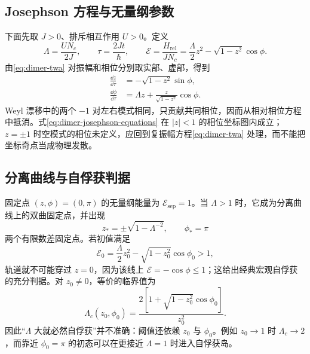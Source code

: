 \subsection{Josephson 方程与无量纲参数}

下面先取 $J>0$、排斥相互作用 $U>0$。定义
\begin{equation}
  \Lambda=\frac{UN_c}{2J},
  \qquad \tau=\frac{2Jt}{\hbar},
  \qquad
  \mathcal E=\frac{H_{\mathrm{rel}}}{JN_c}
  =\frac{\Lambda}{2}z^2-\sqrt{1-z^2}\cos\phi.
  \label{eq:dimer-dimensionless-energy}
\end{equation}
由\cref{eq:dimer-twa} 对振幅和相位分别取实部、虚部，得到
\begin{align}
  \frac{\dd z}{\dd\tau}
  &=-\sqrt{1-z^2}\sin\phi,\\
  \frac{\dd\phi}{\dd\tau}
  &=\Lambda z+\frac{z}{\sqrt{1-z^2}}\cos\phi.
  \label{eq:dimer-josephson-equations}
\end{align}
Weyl 漂移中的两个 $-1$ 对左右模式相同，只贡献共同相位，因而从相对相位方程中抵消。式\eqref{eq:dimer-josephson-equations} 在 $|z|<1$ 的相位坐标图内成立；$z=\pm1$ 时空模式的相位未定义，应回到复振幅方程\eqref{eq:dimer-twa} 处理，而不能把坐标奇点当成物理发散。

\subsection{分离曲线与自俘获判据}

固定点 $(z,\phi)=(0,\pi)$ 的无量纲能量为 $\mathcal E_{\mathrm{sep}}=1$。当 $\Lambda>1$ 时，它成为分离曲线上的双曲固定点，并出现
\begin{equation}
  z_*=\pm\sqrt{1-\Lambda^{-2}},
  \qquad \phi_*=\pi
  \label{eq:dimer-self-trapped-fixed-points}
\end{equation}
两个有限数差固定点。若初值满足
\begin{equation}
  \mathcal E_0=\frac{\Lambda}{2}z_0^2
  -\sqrt{1-z_0^2}\cos\phi_0>1,
  \label{eq:dimer-self-trapping-energy}
\end{equation}
轨道就不可能穿过 $z=0$，因为该线上 $\mathcal E=-\cos\phi\le1$；这给出经典宏观自俘获的充分判据。对 $z_0\ne0$，等价的临界值为
\begin{equation}
  \Lambda_c(z_0,\phi_0)
  =\frac{2\left[1+\sqrt{1-z_0^2}\cos\phi_0\right]}{z_0^2}.
  \label{eq:dimer-critical-lambda}
\end{equation}
因此“$\Lambda$ 大就必然自俘获”并不准确：阈值还依赖 $z_0$ 与 $\phi_0$。例如 $z_0\to1$ 时 $\Lambda_c\to2$，而靠近 $\phi_0=\pi$ 的初态可以在更接近 $\Lambda=1$ 时进入自俘获岛。

